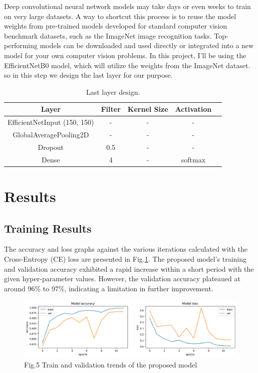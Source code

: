 \documentclass[12pt]{article}
\begin{document}
	Deep convolutional neural network models may take days or even weeks to train on very large datasets.
A way to shortcut this process is to reuse the model weights from pre-trained models developed for standard computer vision benchmark datasets, such as the ImageNet image recognition tasks. Top-performing models can be downloaded and used directly or integrated into a new model for your own computer vision problems.
In this project, I'll be using the EfficientNetB0 model, which will utilize the weights from the ImageNet dataset.
so in this step we design the last layer for our purpose.
\begin{table}[ht]
\centering
\begin{tabular}[t]{ccccc}
\hline
Layer & Filter & Kernel Size & Activation\\
\hline
EfficientNetInput (150, 150) & - & - & -\\
GlobalAveragePooling2D & - & - & - \\
Dropout & 0.5 & - & - \\
Dense & 4 & - & softmax \\
\hline
\end{tabular}
\caption{Last layer design.}
\end{table}%


	\section{Results}
	
	\subsection{Training Results}
	The accuracy and loss graphs against the various iterations calculated with the Cross-Entropy (CE) loss are presented in Fig.\ref{fig:training}. The proposed model's training and validation accuracy exhibited a rapid increase within a short period with the given hyper-parameter values. However, the validation accuracy plateaued at around 96\% to 97\%, indicating a limitation in further improvement.

\begin{center}
\begin{figure}[H]
\includegraphics[width=1\textwidth]{Figs/training.png}
\caption{Fig.5 Train and validation trends of the proposed model}
\label{fig:training}
\end{figure}
\end{center}
\end{document}
